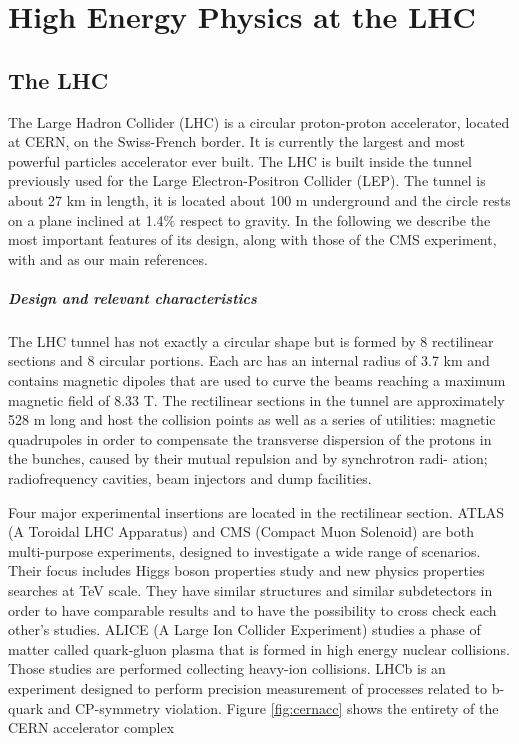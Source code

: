 \chapter{High Energy Physics at the LHC}\label{ch:plhc} %

\section{The LHC}

The Large Hadron Collider (LHC) is a circular proton-proton accelerator, located at
CERN, on the Swiss-French border. It is currently the largest and most powerful
particles accelerator ever built. The LHC is built inside the tunnel previously used
for the Large Electron-Positron Collider (LEP). The tunnel is about 27 km in length,
it is located about 100 m underground and the circle rests on a plane inclined
at 1.4$\%$ respect to gravity. In the following we describe the most important features of its design, along with those of the CMS experiment, with \cite{Giannini:2730094} and \cite{Mandorli:2775677} as our main references.

\paragraph{Design and relevant characteristics}

The LHC tunnel has not exactly a circular shape but is formed by 8 rectilinear sections and 8 circular portions. Each arc has an internal radius of 3.7 km and contains
magnetic dipoles that are used to curve the beams reaching a maximum magnetic
field of 8.33 T. The rectilinear sections in the tunnel are approximately 528 m long and host the collision points as well as a series of utilities: magnetic quadrupoles in order to compensate the transverse dispersion of the
protons in the bunches, caused by their mutual repulsion and by synchrotron radi-
ation; radiofrequency cavities, beam injectors and dump facilities.


Four major experimental insertions are located in the rectilinear section. ATLAS (A Toroidal
LHC Apparatus) and CMS (Compact Muon Solenoid) are both multi-purpose experiments, designed to
investigate a wide range of scenarios. Their focus includes Higgs boson properties
study and new physics properties searches at TeV scale. They have similar structures and similar subdetectors in order to have comparable results and to have the
possibility to cross check each other’s studies. ALICE (A Large Ion Collider Experiment) studies a phase of matter called quark-gluon plasma that is formed in
high energy nuclear collisions. Those studies are performed collecting heavy-ion
collisions. LHCb is an experiment designed to perform precision measurement of processes related to b-quark and CP-symmetry violation. Figure \ref{fig:cernacc} shows the entirety of the CERN accelerator complex

